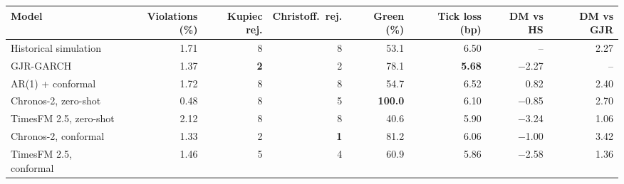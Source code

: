 \begin{tabular}{lrrrrrrr}
\toprule
Model & Violations (\%) & Kupiec rej. & Christoff.\ rej. & Green (\%) & Tick loss (bp) & DM vs HS & DM vs GJR \\
\midrule
Historical simulation & 1.71 & 8 & 8 & 53.1 & 6.50 & -- & 2.27 \\
GJR-GARCH & 1.37 & \textbf{2} & 2 & 78.1 & \textbf{5.68} & $-$2.27 & -- \\
AR(1) + conformal & 1.72 & 8 & 8 & 54.7 & 6.52 & 0.82 & 2.40 \\
Chronos-2, zero-shot & 0.48 & 8 & 5 & \textbf{100.0} & 6.10 & $-$0.85 & 2.70 \\
TimesFM 2.5, zero-shot & 2.12 & 8 & 8 & 40.6 & 5.90 & $-$3.24 & 1.06 \\
Chronos-2, conformal & 1.33 & 2 & \textbf{1} & 81.2 & 6.06 & $-$1.00 & 3.42 \\
TimesFM 2.5, conformal & 1.46 & 5 & 4 & 60.9 & 5.86 & $-$2.58 & 1.36 \\
\bottomrule
\end{tabular}
